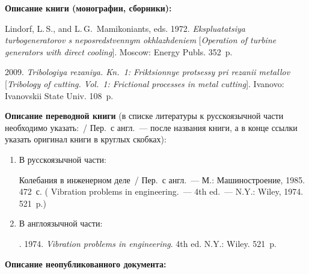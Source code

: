 {\begin{enumerate}[1.]
{\def\leftfootline{\small{\textbf{\thepage}
\hfill ИНФОРМАТИКА И ЕЁ ПРИМЕНЕНИЯ\ \ \ том\ 9\ \ \ выпуск\ 2\ \ \ 2015}
}%
 \def\rightfootline{\small{ИНФОРМАТИКА И ЕЁ ПРИМЕНЕНИЯ\ \ \ том\ 9\ \ \ выпуск\ 2\ \ \ 2015
\hfill \textbf{\thepage}}}



\noindent
\textbf{Описание книги (монографии, сборники):}



Lindorf, L.\,S., and L.\,G.~Mamikoniants, eds. 1972.
\textit{Ekspluatatsiya turbogeneratorov s neposredstvennym
okhlazhdeniem} [\textit{Operation of turbine generators with direct cooling}].
Moscow: Energy Publs. 352~p.


 2009. \textit{Tribologiya rezaniya. Kn.~1: Friktsionnye protsessy
pri rezanii metallov}
[\textit{Tribology of cutting. Vol.~1: Frictional processes in metal cutting}]. Ivanovo: Ivanovskii
State Univ. 108~p.

\def\leftkol{Правила подготовки рукописей  для публикации в журнале
<<Информатика и её применения>>}

\def\rightkol{Правила подготовки рукописей  для публикации в журнале
<<Информатика и её применения>>}

\noindent
\textbf{Описание переводной книги}
(в списке литературы к русскоязычной части необходимо указать:~/ Пер.\ с англ.~---
после названия книги, а в конце ссылки указать оригинал книги в круглых скобках):
\begin{enumerate}[1.]
\item  В русскоязычной части:

\def\leftfootline{\small{\textbf{\thepage}
\hfill ИНФОРМАТИКА И ЕЁ ПРИМЕНЕНИЯ\ \ \ том\ 9\ \ \ выпуск\ 2\ \ \ 2015}
}%
 \def\rightfootline{\small{ИНФОРМАТИКА И ЕЁ ПРИМЕНЕНИЯ\ \ \ том\ 9\ \ \ выпуск\ 2\ \ \ 2015
\hfill \textbf{\thepage}}}

Колебания в инженерном деле~/ Пер.\ с англ.~--- М.: Машиностроение, 1985. 472~с.
(
Vibration problems in engineering.~--- 4th ed.~--- N.Y.: Wiley, 1974. 521~p.)
\item  В англоязычной части:

.
1974. \textit{Vibration problems in engineering}. 4th ed. N.Y.: Wiley. 521~p.
\end{enumerate}


\noindent
\textbf{Описание неопубликованного документа:}

}
\end{enumerate}}
